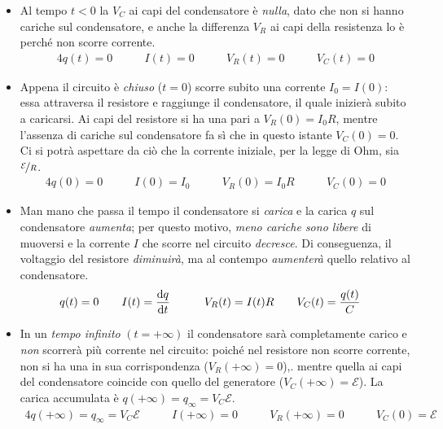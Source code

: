 \begin{itemize}
	\item Al tempo $t<0$ la \ddp $V_C$ ai capi del condensatore è \textit{nulla}, dato che non si hanno cariche sul condensatore, e anche la differenza $V_R$ ai capi della resistenza lo è perché non scorre corrente.
	\begin{alignat*}{4}
		q(t)=0 &\qquad I(t)=0 &\qquad V_R(t)=0 &\qquad V_C(t)=0
	\end{alignat*}
	\item Appena il circuito è \textit{chiuso} ($t=0$) scorre subito una corrente $I_0=I(0)$: essa attraversa il resistore e raggiunge il condensatore, il quale inizierà subito a caricarsi. Ai capi del resistore si ha una \ddp pari a $V_R(0)=I_0R$, mentre l'assenza di cariche sul condensatore fa sì che in questo istante $V_C(0)=0$. Ci si potrà aspettare da ciò che la corrente iniziale, per la legge di Ohm, sia $\nicefrac{\mathcal{E}}{R}$.
	\begin{alignat*}{4}
		q(0)=0 &\qquad I(0)=I_0 &\qquad V_R(0)=I_0R &\qquad V_C(0)=0
	\end{alignat*}
	\item Man mano che passa il tempo il condensatore si \textit{carica} e la carica $q$ sul condensatore \textit{aumenta}; per questo motivo, \textit{meno cariche sono libere} di muoversi e la corrente $I$ che scorre nel circuito \textit{decresce}. Di conseguenza, il voltaggio del resistore \textit{diminuirà}, ma al contempo \textit{aumenterà} quello relativo al condensatore.
	\begin{alignat*}{4}
		q(t)=0 &\qquad I(t)=\dv{q}{t} &\qquad V_R(t)=I(t)R &\qquad V_C(t)=\frac{q(t)}{C}
	\end{alignat*}
	\item In un \textit{tempo infinito} $(t=+\infty)$ il condensatore sarà completamente carico e \textit{non} scorrerà più corrente nel circuito: poiché nel resistore non scorre corrente, non si ha una \ddp in sua corrispondenza ($V_R(+\infty)=0$),. mentre quella ai capi del condensatore coincide con quello del generatore ($V_C(+\infty)=\mathcal{E}$). La carica accumulata è $q(+\infty)=q_{\infty}=V_C\mathcal{E}$.
	\begin{alignat*}{4}
		q(+\infty)=q_{\infty}=V_C\mathcal{E} &\qquad I(+\infty)=0 &\qquad V_R(+\infty)=0 &\qquad V_C(0)=\mathcal{E}
	\end{alignat*}
\end{itemize}

